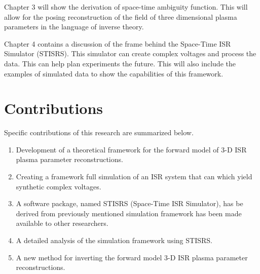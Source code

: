 Chapter 3 will show the derivation of space-time ambiguity function. This will allow for the posing reconstruction of the field of three dimensional plasma parameters in the language of inverse theory. 

Chapter 4 contains a discussion of the frame behind the Space-Time ISR Simulator (STISRS). This simulator can create complex voltages and process the data. This can help plan experiments the future. This will also include the examples of simulated data to show the capabilities of this framework.


\section{Contributions}
Specific contributions of this research are summarized below.

\begin{enumerate}
\item Development of a theoretical framework for the forward model of 3-D ISR plasma parameter reconstructions.
\item Creating a framework full simulation of an ISR system that can which yield synthetic complex voltages.
\item A software package, named STISRS (Space-Time ISR Simulator), has be derived from previously mentioned simulation framework has been made available to other researchers.
\item A detailed analysis of the simulation framework using STISRS.
\item A new method for inverting the forward model 3-D ISR plasma parameter reconstructions.
\end{enumerate}